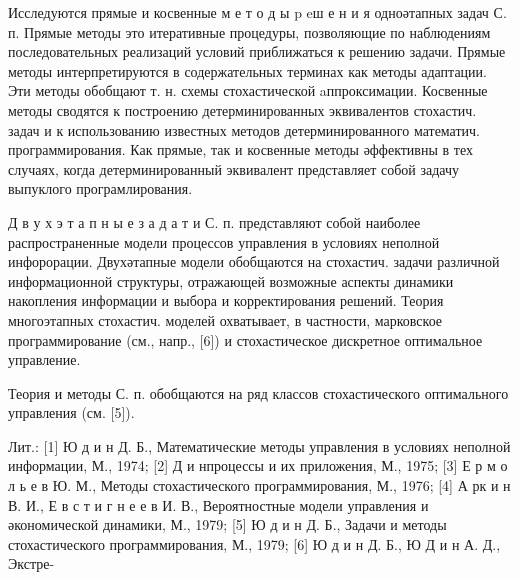 \documentclass[10pt]{article}
\begin{document}
Исследуются прямые и косвенные м е т о д ы p eш е н и я одноәтапных задач С. п. Прямые методы это итеративные процедуры, позволяющие по наблюдениям последовательных реализаций условий приближаться к решению задачи. Прямые методы интерпретируются в содержательных терминах как методы адаптации. Эти методы обобщают т. н. схемы стохастической aппроксимации. Косвенные методы сводятся к построению детерминированных эквивалентов стохастич. задач и к использованию известных методов детерминированного математич. программирования. Как прямые, так и косвенные методы әффективны в тех случаях, когда детерминированный эквивалент представляет собой задачу выпуклого програмлирования.



Д в у х э т а п н ы е з а д а т и С. п. представляют собой наиболее распространенные модели процессов управления в условиях неполной инфорорации. Двухәтапные модели обобщаются на стохастич. задачи различной информационной структуры, отражающей возможные аспекты динамики накопления информации и выбора и корректирования решений. Теория многоэтапных стохастич. моделей охватывает, в частности, марковское программирование (см., напр., [6]) и стохастическое дискретное оптимальное управление.



Теория и методы С. п. обобщаются на ряд классов стохастического оптимального управления (см. [5]).



Лит.: [1] Ю д и н Д. Б., Математические методы управления в условиях неполной информации, М., 1974; [2] Д и нпроцессы и их приложения, М., 1975; [3] Е р м о л ь е в Ю. М., Методы стохастического программирования, М., 1976; [4] А рк и н В. И., Е в с т и г н е е в И. В., Вероятностные модели управления и әкономической динамики, М., 1979; [5] Ю д и н Д. Б., Задачи и методы стохастического программирования, М., 1979; [6] Ю д и н Д. Б., Ю Д и н А. Д., Экстре-
\end{document}
